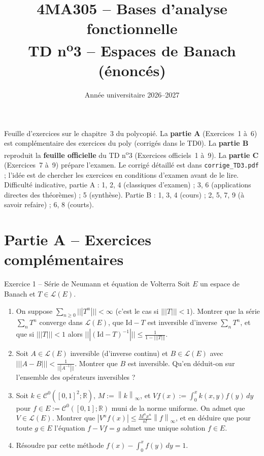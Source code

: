 \documentclass[11pt,a4paper]{article}
\title{\textbf{4MA305 -- Bases d'analyse fonctionnelle}\\[2mm]
\Large TD n\textsuperscript{o}3 -- Espaces de Banach (énoncés)}
\author{}
\date{Année universitaire 2026--2027}
\newcommand{\R}{\mathbb{R}}
\newcommand{\norm}[1]{\left\|#1\right\|}
\newcommand{\opnorm}[1]{|\!|\!|#1|\!|\!|}
\newcommand{\Lc}{\mathcal{L}}
\newcommand{\Cz}{\mathcal{C}^0}
\theoremstyle{definition}
\begin{document}
\maketitle

\begin{commentaire}
Feuille d'exercices sur le chapitre~3 du polycopié. La \textbf{partie A} (Exercices~1 à~6) est complémentaire des exercices du poly (corrigés dans le TD0). La \textbf{partie B} reproduit la \textbf{feuille officielle} du TD n\textsuperscript{o}3 (Exercices officiels~1 à~9). La \textbf{partie C} (Exercices~7 à~9) prépare l'examen. Le corrigé détaillé est dans \texttt{corrige\_TD3.pdf} ; l'idée est de chercher les exercices en conditions d'examen avant de le lire. Difficulté indicative, partie A : 1, 2, 4 (classiques d'examen) ; 3, 6 (applications directes des théorèmes) ; 5 (synthèse). Partie B : 1, 3, 4 (cours) ; 2, 5, 7, 9 (à savoir refaire) ; 6, 8 (courts).
\end{commentaire}

\section*{Partie A -- Exercices complémentaires}

\begin{exo}{Exercice 1 -- Série de Neumann et équation de Volterra}
Soit $E$ un espace de Banach et $T\in\Lc(E)$.
\begin{enumerate}[label=(\alph*)]
  \item On suppose $\sum_{n\ge0}\opnorm{T^n}<\infty$ (c'est le cas si $\opnorm T<1$). Montrer que la série $\sum_nT^n$ converge dans $\Lc(E)$, que $\mathrm{Id}-T$ est inversible d'inverse $\sum_nT^n$, et que si $\opnorm T<1$ alors $\opnorm{(\mathrm{Id}-T)^{-1}}\le\frac1{1-\opnorm T}$.
  \item Soit $A\in\Lc(E)$ inversible (d'inverse continu) et $B\in\Lc(E)$ avec $\opnorm{A-B}<\frac1{\opnorm{A^{-1}}}$. Montrer que $B$ est inversible. Qu'en déduit-on sur l'ensemble des opérateurs inversibles ?
  \item Soit $k\in\Cz([0,1]^2;\R)$, $M:=\norm k_\infty$, et $Vf(x):=\int_0^xk(x,y)f(y)\,dy$ pour $f\in E:=\Cz([0,1];\R)$ muni de la norme uniforme. On admet que $V\in\Lc(E)$. Montrer que $|V^nf(x)|\le\frac{M^nx^n}{n!}\norm f_\infty$, et en déduire que pour toute $g\in E$ l'équation $f-Vf=g$ admet une unique solution $f\in E$.
  \item Résoudre par cette méthode $f(x)-\int_0^xf(y)\,dy=1$.
\end{enumerate}
\end{exo}
\end{document}
